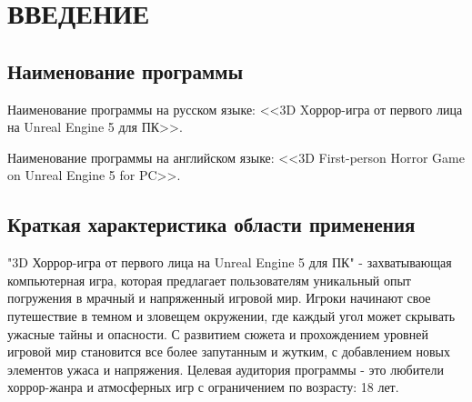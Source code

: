 \section{ВВЕДЕНИЕ}

\subsection{Наименование программы}

Наименование программы на русском языке: <<3D Xоррор-игра от первого лица на Unreal Engine 5 для ПК>>.

Наименование программы на английском языке:  <<3D First-person Horror Game on Unreal Engine 5 for PC>>.

\subsection{Краткая характеристика области применения}

"3D Хоррор-игра от первого лица на Unreal Engine 5 для ПК" - захватывающая компьютерная игра, 
которая предлагает пользователям уникальный опыт погружения в мрачный и напряженный игровой мир. 
Игроки начинают свое путешествие в темном и зловещем окружении, где каждый угол может скрывать ужасные тайны и опасности. 
С развитием сюжета и прохождением уровней игровой мир становится все более запутанным и жутким, с добавлением новых элементов ужаса и напряжения. 
Целевая аудитория программы - это любители хоррор-жанра и атмосферных игр с ограничением по возрасту: 18 лет.

